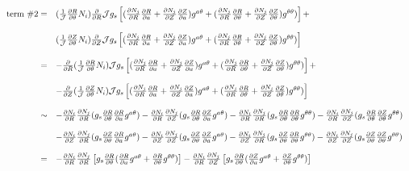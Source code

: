 \documentclass{report}
\newcommand{\ff}[2]{\frac{#1}{#2}}
\newcommand{\pp}[2]{\frac{\partial{#1}}{\partial{#2}}}
\begin{document}
\begin{equation}
\label{eq:poisson7-term2}
   \begin{array}{rl}
\mbox{term \#2}= 
& (\ff{1}{\cal J} \pp{R}{\theta} N_i) \pp{}{R} {\cal J} g_s \left[
           (\pp{N_j}{R} \pp{R}{a}      + \pp{N_j}{Z} \pp{Z}{a}) g^{a \theta} +
           (\pp{N_j}{R} \pp{R}{\theta} + \pp{N_j}{Z} \pp{Z}{\theta}) g^{\theta \theta})
                                          \right]+
\\
& \\
& (\ff{1}{\cal J} \pp{Z}{\theta} N_i) \pp{}{Z} {\cal J} g_s \left[
           (\pp{N_j}{R} \pp{R}{a}      + \pp{N_j}{Z} \pp{Z}{a}) g^{a \theta} +
           (\pp{N_j}{R} \pp{R}{\theta} + \pp{N_j}{Z} \pp{Z}{\theta}) g^{\theta \theta})
                                          \right]
\\
& \\
= & 
 -\pp{}{R} (\ff{1}{\cal J} \pp{R}{\theta} N_i) {\cal J} g_s \left[
           (\pp{N_j}{R} \pp{R}{a}      + \pp{N_j}{Z} \pp{Z}{a}) g^{a \theta} +
           (\pp{N_j}{R} \pp{R}{\theta} + \pp{N_j}{Z} \pp{Z}{\theta}) g^{\theta \theta})
                                          \right]+
\\
& \\
&-\pp{}{Z} (\ff{1}{\cal J} \pp{Z}{\theta} N_i) {\cal J} g_s \left[
           (\pp{N_j}{R} \pp{R}{a}      + \pp{N_j}{Z} \pp{Z}{a}) g^{a \theta} +
           (\pp{N_j}{R} \pp{R}{\theta} + \pp{N_j}{Z} \pp{Z}{\theta}) g^{\theta \theta})
                                          \right]
\\
& \\
\sim & 
 -\pp{N_i}{R}\pp{N_j}{R} (g_s \pp{R}{\theta} \pp{R}{a} g^{a \theta})
 -\pp{N_i}{R}\pp{N_j}{Z} (g_s \pp{R}{\theta} \pp{Z}{a} g^{a \theta})
 -\pp{N_i}{R}\pp{N_j}{R} (g_s \pp{R}{\theta} \pp{R}{\theta} g^{\theta \theta})
 -\pp{N_i}{R}\pp{N_j}{Z} (g_s \pp{R}{\theta} \pp{Z}{\theta} g^{\theta \theta})
\\
& \\
&-\pp{N_i}{Z}\pp{N_j}{R} (g_s \pp{Z}{\theta} \pp{R}{a} g^{a \theta})
 -\pp{N_i}{Z}\pp{N_j}{Z} (g_s \pp{Z}{\theta} \pp{Z}{a} g^{a \theta})
 -\pp{N_i}{Z}\pp{N_j}{R} (g_s \pp{Z}{\theta} \pp{R}{\theta} g^{\theta \theta})
 -\pp{N_i}{Z}\pp{N_j}{Z} (g_s \pp{Z}{\theta} \pp{Z}{\theta} g^{\theta \theta})
\\
& \\
=&
 -\pp{N_i}{R}\pp{N_j}{R} \left[g_s \pp{R}{\theta} (\pp{R}{a} g^{a \theta} + \pp{R}{\theta} g^{\theta \theta}) \right]
 -\pp{N_i}{R}\pp{N_j}{Z} \left[g_s \pp{R}{\theta} (\pp{Z}{a} g^{a \theta} + \pp{Z}{\theta} g^{\theta \theta}) \right]

\end{array}
\end{equation}
\end{document}
